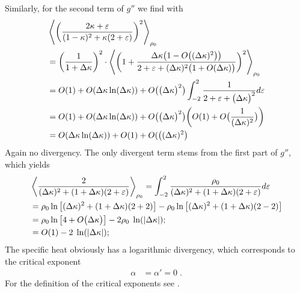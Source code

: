 Similarly, for the second term of $g''$ we  find with 
%
\begin{align*}
&\left\langle
\bigg(\frac{2\kappa +\varepsilon}{(1-\kappa)^{2}+\kappa(2+\varepsilon)}\bigg)^{2}
\right\rangle_{\rho_{0}}\\
 &= \bigg(\frac{1}{1+\Delta\kappa} \bigg)^{2}\cdot 
\left\langle\bigg(1 + \frac{ \Delta\kappa\big( 1-O\big((\Delta\kappa)^{2}\big) \big)   }{2+\varepsilon+ (\Delta\kappa)^{2}\big(1 + O(\Delta\kappa)\big)}\bigg)^{2}\right\rangle_{\rho_{0}}\\
&= O(1) + O(\Delta\kappa \ln(\Delta\kappa)) + O\big(\big(\Delta\kappa\big)^{2}\big)\int_{-2}^{2} \frac{1}{2+\varepsilon+\big(\Delta\kappa  \big)^{2}}d\varepsilon\\
&= O(1) + O(\Delta\kappa \ln(\Delta\kappa)) + O\big(\big(\Delta\kappa\big)^{2}\big)
\bigg( O(1) + O\big( \frac{1}{(\Delta\kappa)^{2}} \big) \bigg)\\
&=  O(\Delta\kappa \ln(\Delta\kappa))+O(1) + O(\big( (\Delta\kappa)^{2} \big)
\end{align*}
%
Again no divergency.
The only divergent term stems from the first part of $g''$, which yields
%
\begin{align*}
&\left\langle\frac{2}{(\Delta\kappa)^{2}+(1+\Delta\kappa)(2+\varepsilon)}\right\rangle_{\rho_{0}} 
=
\int_{-2}^{2} \frac{\rho_{0} }{(\Delta\kappa)^{2}+(1+\Delta\kappa)(2+\varepsilon)} d\varepsilon\\
&= \rho_{0} \ln\big[ (\Delta\kappa)^{2}+(1+\Delta\kappa)(2+2) \big]
-
\rho_{0} \ln\big[ (\Delta\kappa)^{2}+(1+\Delta\kappa)(2-2) \big]\\
&= \rho_{0} \ln\big[ 4 + O\big(\Delta\kappa\big) \big]
-
2 \rho_{0} \;\ln(\abs{\Delta\kappa});\\
&=O(1)  - 2 \;\ln(\abs{\Delta\kappa});
\end{align*}
%
The specific heat obviously has a logarithmic divergency, which corresponds
to the critical exponent
%
\begin{align}
\alpha &=\alpha' = 0\;.
\end{align}
%
For the definition of the critical exponents see .

%
